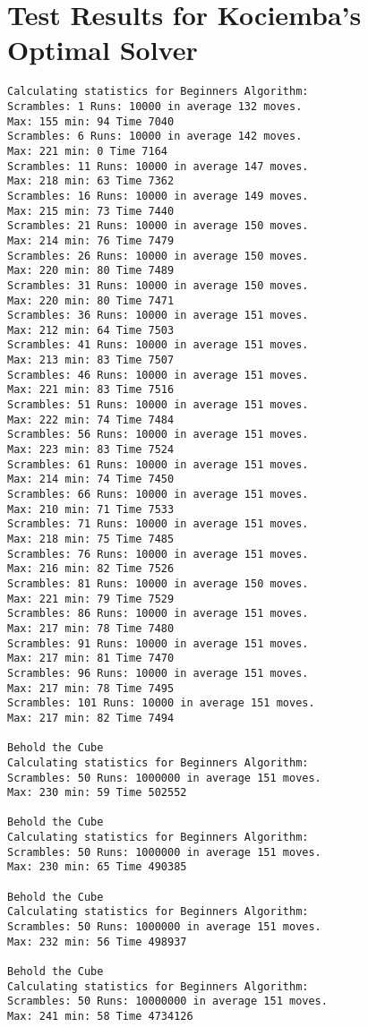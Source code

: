 \chapter{Test Results for Kociemba's Optimal Solver}
\label{chap:kociembaResults}
\emptyTop{}
\begin{lstlisting}[breaklines=true, basicstyle=\ttfamily\footnotesize]
Calculating statistics for Beginners Algorithm:
Scrambles: 1 Runs: 10000 in average 132 moves. 
Max: 155 min: 94 Time 7040
Scrambles: 6 Runs: 10000 in average 142 moves. 
Max: 221 min: 0 Time 7164
Scrambles: 11 Runs: 10000 in average 147 moves. 
Max: 218 min: 63 Time 7362
Scrambles: 16 Runs: 10000 in average 149 moves. 
Max: 215 min: 73 Time 7440
Scrambles: 21 Runs: 10000 in average 150 moves. 
Max: 214 min: 76 Time 7479
Scrambles: 26 Runs: 10000 in average 150 moves. 
Max: 220 min: 80 Time 7489
Scrambles: 31 Runs: 10000 in average 150 moves. 
Max: 220 min: 80 Time 7471
Scrambles: 36 Runs: 10000 in average 151 moves. 
Max: 212 min: 64 Time 7503
Scrambles: 41 Runs: 10000 in average 151 moves. 
Max: 213 min: 83 Time 7507
Scrambles: 46 Runs: 10000 in average 151 moves. 
Max: 221 min: 83 Time 7516
Scrambles: 51 Runs: 10000 in average 151 moves. 
Max: 222 min: 74 Time 7484
Scrambles: 56 Runs: 10000 in average 151 moves. 
Max: 223 min: 83 Time 7524
Scrambles: 61 Runs: 10000 in average 151 moves. 
Max: 214 min: 74 Time 7450
Scrambles: 66 Runs: 10000 in average 151 moves. 
Max: 210 min: 71 Time 7533
Scrambles: 71 Runs: 10000 in average 151 moves. 
Max: 218 min: 75 Time 7485
Scrambles: 76 Runs: 10000 in average 151 moves. 
Max: 216 min: 82 Time 7526
Scrambles: 81 Runs: 10000 in average 150 moves. 
Max: 221 min: 79 Time 7529
Scrambles: 86 Runs: 10000 in average 151 moves. 
Max: 217 min: 78 Time 7480
Scrambles: 91 Runs: 10000 in average 151 moves. 
Max: 217 min: 81 Time 7470
Scrambles: 96 Runs: 10000 in average 151 moves. 
Max: 217 min: 78 Time 7495
Scrambles: 101 Runs: 10000 in average 151 moves. 
Max: 217 min: 82 Time 7494

Behold the Cube
Calculating statistics for Beginners Algorithm:
Scrambles: 50 Runs: 1000000 in average 151 moves. 
Max: 230 min: 59 Time 502552

Behold the Cube
Calculating statistics for Beginners Algorithm:
Scrambles: 50 Runs: 1000000 in average 151 moves. 
Max: 230 min: 65 Time 490385

Behold the Cube
Calculating statistics for Beginners Algorithm:
Scrambles: 50 Runs: 1000000 in average 151 moves. 
Max: 232 min: 56 Time 498937

Behold the Cube
Calculating statistics for Beginners Algorithm:
Scrambles: 50 Runs: 10000000 in average 151 moves. 
Max: 241 min: 58 Time 4734126

\end{lstlisting}